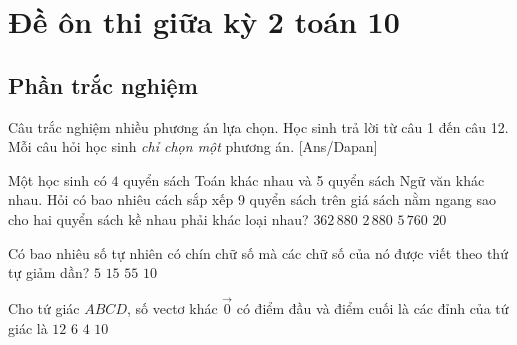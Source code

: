  \section{Đề ôn thi giữa kỳ 2 toán 10}
\subsection{Phần trắc nghiệm}
Câu trắc nghiệm nhiều phương án lựa chọn. Học sinh trả lời từ
câu 1 đến câu 12. Mỗi câu hỏi học sinh \textit{chỉ chọn một} phương án.
[Ans/Dapan] 
\hienthiloigiaiex
\begin{ex} %
	Một học sinh có $4$ quyển sách Toán khác nhau và 5 quyển sách Ngữ văn khác nhau. Hỏi có bao nhiêu cách sắp xếp 9 quyển sách trên giá sách nằm ngang sao cho hai quyển sách kề nhau phải khác loại nhau?
	\choice
	{$362\,880$}
	{\True $2\,880$}
	{$5\,760$}
	{$20$}
\end{ex}
\begin{ex}%
	Có bao nhiêu số tự nhiên có chín chữ số mà các chữ số của nó được viết theo thứ tự giảm dần?
	\choice
	{ $5$}
	{ $15$}
	{ $55$}
	{\True $10$}
\end{ex}
\begin{ex}%
	Cho tứ giác $ABCD$, số vectơ khác $\overrightarrow{0}$ có điểm đầu và điểm cuối là các đỉnh của tứ giác là
	\choice
	{\True $12$}
	{$ 6$}
	{$ 4$}
	{ $10$}
\end{ex}
